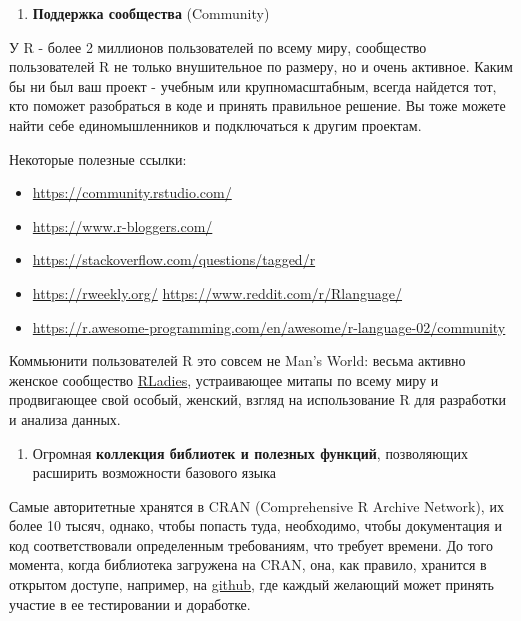 \documentclass[
  letterpaper,
  DIV=11,
  numbers=noendperiod]{scrreprt}
\providecommand{\tightlist}{%
  \setlength{\itemsep}{0pt}\setlength{\parskip}{0pt}}\usepackage{longtable,booktabs,array}
\begin{document}
\begin{enumerate}
\def\labelenumi{\arabic{enumi}.}
\setcounter{enumi}{2}
\tightlist
\item
  \textbf{Поддержка сообщества} (Community)
\end{enumerate}

У R - более 2 миллионов пользователей по всему миру, сообщество
пользователей R не только внушительное по размеру, но и очень активное.
Каким бы ни был ваш проект - учебным или крупномасштабным, всегда
найдется тот, кто поможет разобраться в коде и принять правильное
решение. Вы тоже можете найти себе единомышленников и подключаться к
другим проектам.

Некоторые полезные ссылки:

\begin{itemize}
\tightlist
\item
  \url{https://community.rstudio.com/}
\item
  \url{https://www.r-bloggers.com/}
\item
  \url{https://stackoverflow.com/questions/tagged/r}
\item
  \url{https://rweekly.org/} \url{https://www.reddit.com/r/Rlanguage/}
\item
  \url{https://r.awesome-programming.com/en/awesome/r-language-02/community}
\end{itemize}

Коммьюнити пользователей R это совсем не Man's World: весьма активно
женское сообщество
\href{https://en.wikipedia.org/wiki/R-Ladies}{RLadies}, устраивающее
митапы по всему миру и продвигающее свой особый, женский, взгляд на
использование R для разработки и анализа данных.

\begin{enumerate}
\def\labelenumi{\arabic{enumi}.}
\setcounter{enumi}{3}
\tightlist
\item
  Огромная \textbf{коллекция библиотек и полезных функций}, позволяющих
  расширить возможности базового языка
\end{enumerate}

Самые авторитетные хранятся в CRAN (Comprehensive R Archive Network), их
более 10 тысяч, однако, чтобы попасть туда, необходимо, чтобы
документация и код соответствовали определенным требованиям, что требует
времени. До того момента, когда библиотека загружена на CRAN, она, как
правило, хранится в открытом доступе, например, на
\href{https://github.com/search?q=R}{github}, где каждый желающий может
принять участие в ее тестировании и доработке.
\end{document}
